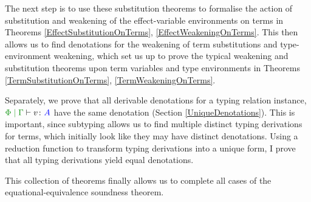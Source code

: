 \documentclass{Report}
\begin{document}
The next step is to use these substitution theorems to formalise the action of substitution and weakening of the effect-variable environments on terms in Theorems \ref{EffectSubstitutionOnTerms}, \ref{EffectWeakeningOnTerms}. This then allows us to find denotations for the weakening of term substitutions and type-environment weakening, which set us up to prove the typical weakening and substitution theorems upon term variables and type environments in Theorems \ref{TermSubstitutionOnTerms}, \ref{TermWeakeningOnTerms}. 

Separately, we prove that all derivable denotations for a typing relation instance, $\gpetyperelation{v}{A}$ have the same denotation (Section \ref{UniqueDenotations}). This is important, since subtyping allows us to find multiple distinct typing derivations for terms, which initially look like they may have distinct denotations. Using a reduction function to transform typing derivations into a unique form, I prove that all typing derivations yield equal denotations.

This collection of theorems finally allows us to complete all cases of the equational-equivalence soundness theorem.
\end{document}
